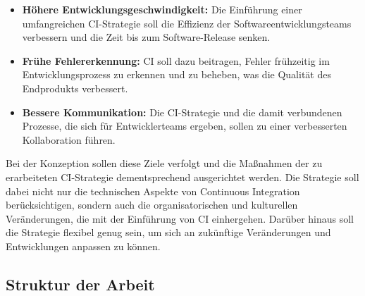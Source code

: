 \begin{itemize}
    \item \textbf{Höhere Entwicklungsgeschwindigkeit:} Die Einführung einer umfangreichen CI-Strategie soll die
          Effizienz der Softwareentwicklungsteams verbessern und die Zeit bis zum Software-Release senken.

    \item \textbf{Frühe Fehlererkennung:} CI soll dazu beitragen, Fehler frühzeitig im Entwicklungsprozess zu erkennen
          und zu beheben, was die Qualität des Endprodukts verbessert.

    \item \textbf{Bessere Kommunikation:} Die CI-Strategie und die damit verbundenen Prozesse, die sich für
          Entwicklerteams ergeben, sollen zu einer verbesserten Kollaboration führen.
\end{itemize}

Bei der Konzeption sollen diese Ziele verfolgt und die Maßnahmen der zu erarbeiteten CI-Strategie dementsprechend
ausgerichtet werden.
Die Strategie soll dabei nicht nur die technischen Aspekte von Continuous Integration berücksichtigen, sondern auch die
organisatorischen und kulturellen Veränderungen, die mit der Einführung von CI einhergehen.
Darüber hinaus soll die Strategie flexibel genug sein, um sich an zukünftige Veränderungen und Entwicklungen anpassen
zu können.

\subsection{Struktur der Arbeit} \label{subsec:01-introduction-3}

\clearpage
